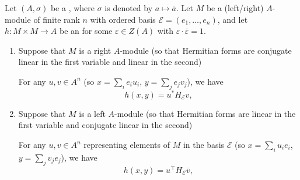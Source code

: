 \begin{lemma} \label{lemma:hermitian_form_evaluates_by_transpose_of_first_column_vector_then_matrix_then_vector}
    Let $(A,\sigma)$ be a , where $\sigma$ is denoted by $a \mapsto \overline{a}$. Let $M$ be a  (left/right) $A$-module of finite rank $n$ with ordered basis $\mathcal{E} = (e_1,\ldots,e_n)$, and let $h: M \times M \to A$ be an  for some $\varepsilon \in Z(A)$ with $\varepsilon \cdot \overline{\varepsilon} = 1$.

    \begin{enumerate}
        \item Suppose that $M$ is a right $A$-module (so that Hermitian forms are conjugate linear in the first variable and linear in the second)

        For any  $u,v \in A^n$  (so $x = \sum_i e_i u_i$, $y = \sum_j e_j v_j$), we have
        $$h(x,y) = u^* H_{\mathcal{E}} v,$$

        \item Suppose that $M$ is a left $A$-module (so that Hermitian forms are linear in the first variable and conjugate linear in the second)

        For any  $u,v \in A^n$ representing elements of $M$ in the basis $\mathcal{E}$ (so $x = \sum_i u_i e_i$, $y = \sum_j v_j e_j$), we have
        $$h(x,y) = u^\top H_{\mathcal{E}} \overline{v},$$
    \end{enumerate}
\end{lemma}
